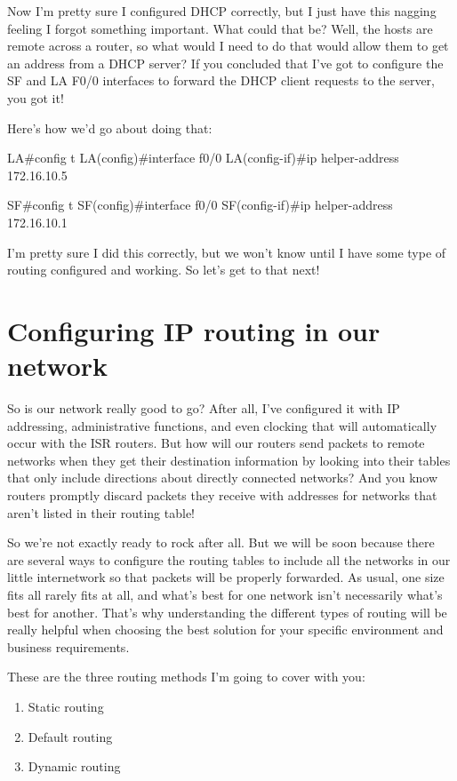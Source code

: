 Now I'm pretty sure I configured DHCP correctly, but I just have this
nagging feeling I forgot something important. What could that be? Well,
the hosts are remote across a router, so what would I need to do that
would allow them to get an address from a DHCP server? If you concluded
that I've got to configure the SF and LA F0/0 interfaces to forward the
DHCP client requests to the server, you got it!

Here's how we'd go about doing that:

\begin{cli}
LA#config t
LA(config)#interface f0/0
LA(config-if)#ip helper-address 172.16.10.5

SF#config t
SF(config)#interface f0/0
SF(config-if)#ip helper-address 172.16.10.1
\end{cli}

I'm pretty sure I did this correctly, but we won't know until I have
some type of routing configured and working. So let's get to that next!



\section{Configuring IP routing in our network}

So is our network really good to go? After all, I've configured it with
IP addressing, administrative functions, and even clocking that will
automatically occur with the ISR routers. But how will our routers send
packets to remote networks when they get their destination information by looking into their tables that only include directions about directly
connected networks? And you know routers promptly discard packets they receive with addresses for networks that aren't listed in their routing table!

So we're not exactly ready to rock after all. But we will be soon
because there are several ways to configure the routing tables to
include all the networks in our little internetwork so that packets will
be properly forwarded. As usual, one size fits all rarely fits at all,
and what's best for one network isn't necessarily what's best for
another. That's why understanding the different types of routing will be
really helpful when choosing the best solution for your specific
environment and business requirements.

These are the three routing methods I'm going to cover with you:

\begin{enumerate}
\item
  Static routing
\item
  Default routing
\item
  Dynamic routing
\end{enumerate}

